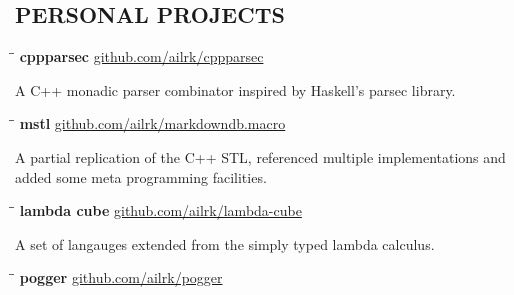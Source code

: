 \documentclass{res}
\begin{document}
\begin{resume}
\vspace{-0.2in}
\section{PERSONAL PROJECTS}

    \vspace{-0.1in}
    \begin{tabbing}
        \hspace{2.4in}\= \hspace{0.9in}\= \kill
        {\bf cppparsec } \>               \>\url{github.com/ailrk/cppparsec}\\

    \end{tabbing}\vspace{-30pt}
    A C++ monadic parser combinator inspired by Haskell's parsec library.

    \vspace{-0.2in}
    \begin{tabbing}
        \hspace{2.4in}\= \hspace{0.9in}\= \kill
        {\bf mstl } \>               \>\url{github.com/ailrk/markdowndb.macro}\\
    \end{tabbing}\vspace{-30pt}
    A partial replication of the C++ STL, referenced multiple implementations and added some meta programming facilities.

    \vspace{-0.2in}
    \begin{tabbing}
        \hspace{2.4in}\= \hspace{0.9in}\= \kill
        {\bf lambda cube} \>               \>\url{github.com/ailrk/lambda-cube}\\

    \end{tabbing}\vspace{-30pt}
    A set of langauges extended from the simply typed lambda calculus.

    \vspace{-0.2in}
    \begin{tabbing}
        \hspace{2.4in}\= \hspace{0.9in}\= \kill
        {\bf pogger } \>               \>\url{github.com/ailrk/pogger}\\


\end{tabbing}
\end{resume}
\end{document}
